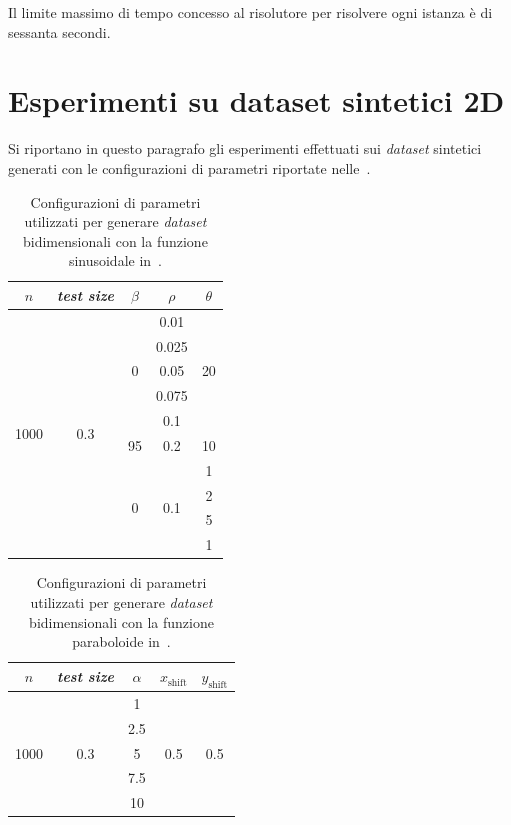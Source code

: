 Il limite massimo di tempo concesso al risolutore per risolvere ogni istanza è di sessanta secondi.

\section{Esperimenti su dataset sintetici 2D}\label{sec:exp:synth_2d}
Si riportano in questo paragrafo gli esperimenti effettuati sui \emph{dataset} sintetici generati con le configurazioni di parametri riportate nelle~.
\begin{table}
    \centering
    \begin{tabular}{ccccc}
        \toprule
         $n$ & \emph{test size} & $\beta$ & $\rho$ & $\theta$ \\
        \midrule
        \multirow{10}{*}{1000} & \multirow{10}{*}{0.3} &\multirow{5}{*}{0}  & 0.01  & \multirow{5}{*}{20} \\        
                            &&& 0.025 &     \\        
                            &&& 0.05  &     \\        
                            &&& 0.075 &     \\        
                            &&& 0.1   &     \\
        \cline{3-5}
                &&  95      & 0.2   & 10    \\   
        \cline{3-5}
        &&  \multirow{4}{*}{0}  & \multirow{4}{*}{0.1}  & 1     \\    
                            &&&                       & 2     \\    
                            &&&                       & 5     \\    
                            &&&                       & 1     \\    
        \bottomrule
    \end{tabular}
    \caption{Configurazioni di parametri utilizzati per generare \emph{dataset} bidimensionali con la funzione sinusoidale in~.}
    \label{tab:parametri_ds_sin}
\end{table}
\begin{table}
    \centering
    \begin{tabular}{ccccc}
        \toprule
         $n$ & \emph{test size} &$\alpha$ & $x_\text{shift}$ & $y_\text{shift}$ \\
        \midrule
        \multirow{5}{*}{1000} & \multirow{5}{*}{0.3} &1   & \multirow{5}{*}{0.5} & \multirow{5}{*}{0.5} \\
        && 2.5 &\\
        && 5   &\\
        && 7.5 &\\
        && 10  &\\
        \bottomrule
    \end{tabular}
    \caption{Configurazioni di parametri utilizzati per generare \emph{dataset} bidimensionali con la funzione paraboloide in~.}
    \label{tab:parametri_ds_pacman}
\end{table}

